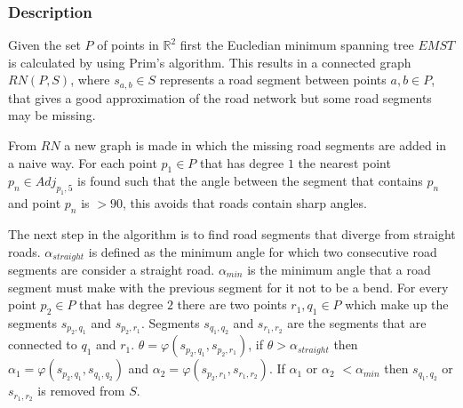 \documentclass[11pt]{article}
\begin{document}
\subsubsection{Description}
Given the set $P$ of points in $\mathbb{R}^2$ first the Eucledian minimum spanning tree $EMST$ is calculated by using Prim's algorithm. This results in a connected graph $RN(P,S)$, where $s_{a,b}\in S$ represents a road segment between points $a,b \in P$, that gives a good approximation of the road network but some road segments may be missing.%

From $RN$ a new graph is made in which the missing road segments are added in a naive way. For each point $p_1 \in P$ that has degree $1$ the nearest point $p_n \in Adj_{p_1,5}$ is found such that the angle between the segment that contains $p_n$ and point $p_n$ is $>90$, this avoids that roads contain sharp angles. 

The next step in the algorithm is to find road segments that diverge from straight roads. $\alpha_{straight}$ is defined as the minimum angle for which two consecutive road segments are consider a straight road. $\alpha_{min}$ is the minimum angle that a road segment must make with the previous segment for it not to be a bend. For every point $p_2 \in P$ that has degree $2$ there are two points $r_1, q_1 \in P$ which make up the segments $s_{p_2, q_1}$ and $s_{p_2,r_1}$. Segments $s_{q_1, q_2}$ and $s_{r_1,r_2}$ are the segments that are connected to $q_1$ and $r_1$. $\theta=\varphi(s_{p_2, q_1},s_{p_2,r_1})$, if $\theta> \alpha_{straight}$ then $\alpha_1=\varphi(s_{p_2, q_1},s_{q_1, q_2})$ and $\alpha_2=\varphi(s_{p_2, r_1},s_{r_1, r_2})$. If $\alpha_1$ or $\alpha_2$ $<\alpha_{min}$ then $s_{q_1, q_2}$ or $s_{r_1, r_2}$ is removed from $S$.
\end{document}
